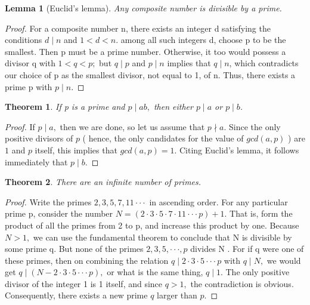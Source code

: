 \documentclass[a4paper,draft]{amsproc}
\theoremstyle{plain}
\newtheorem{thm}{Theorem}[section]
\newtheorem{lem}{Lemma}[section]
\theoremstyle{definition}
\theoremstyle{remark}
\numberwithin{equation}{section}
\begin{document}
\begin{lem}[Euclid's lemma]
 Any composite number is divisible by a prime.
\end{lem}
\begin{proof}
For a composite number n, there exists an integer d satisfying the conditions $d\mid{n}$
 and $1<d<n.$ among all such integers d, choose p to be the smallest. Then p must be a prime number. Otherwise, it too would possess a divisor q with $1<q<p;$ but $q\mid{p}$ and $p\mid{n}$ implies that $q\mid{n}$, which contradicts our choice of p as the smallest divisor, not equal to 1, of n. Thus, there exists a prime p with $p\mid{n}.$
\end{proof}

\begin{thm}
If p is a prime and $p\mid{ab},$ then either $p\mid{a}$ or $p\mid{b}$.
\end{thm}

\begin{proof}
If $p\mid{a},$ then we are done, so let us assume that $p\nmid{a}.$ Since the only positive divisors of $p$ ( hence, the only candidates for the value of $gcd(a,p)$ ) are $1$ and $p$ itself, this implies that $gcd(a,p)=1.$ Citing Euclid's lemma, it follows immediately that $p\mid{b}$.
\end{proof}

\begin{thm}
There are an infinite number of primes.
\end{thm}

\begin{proof}
 Write the primes $2, 3, 5, 7, 11\cdot\cdot\cdot $ in ascending order. For any particular prime p, consider the number
                       $ N= (2\cdot3\cdot5\cdot7\cdot11\cdot\cdot\cdot p) +1.$
That is, form the product of all the primes from 2 to p, and increase this product by one. Because $N >1,$ we can use the fundamental theorem to conclude that N is divisible by some prime q. But none of the primes $2, 3, 5,\cdot\cdot\cdot , p$ divides N . For if q were one of these primes, then on combining the relation $ q\mid2\cdot3\cdot5\cdot\cdot\cdot p$ with $q\mid N,$ we would get $ q\mid(N-2\cdot3\cdot5\cdot\cdot\cdot p),$ or what is the same thing, $ q\mid1.$ The only positive divisor of the integer 1 is 1 itself, and since $q >1,$ the contradiction is obvious. Consequently, there exists a new prime $q$ larger than $p$.
\end{proof}
\newpage
\end{document}
